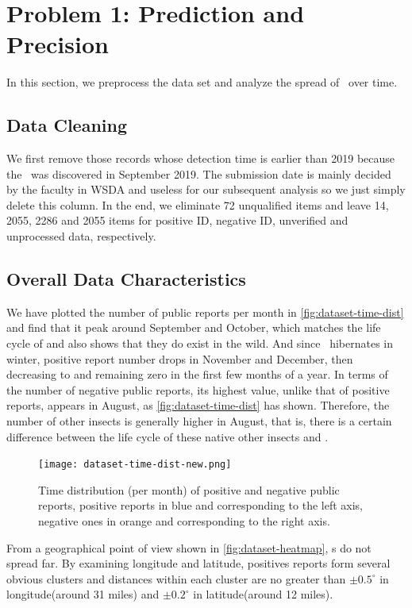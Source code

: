 \documentclass{mcmthesis}
\begin{document}
\section{Problem 1: Prediction and Precision}
In this section, we preprocess the data set and analyze the spread of \VM\ over time.
\subsection{Data Cleaning}
We first remove those records whose detection time is earlier than 2019 because the \VM\ was discovered in September 2019. The submission date is mainly decided by the faculty in WSDA and useless for our subsequent analysis so we just simply delete this column. In the end, 
we eliminate 72 unqualified items and leave 14, 2055, 2286 and 2055 items for positive ID, negative ID, unverified and unprocessed data, respectively.

\subsection{Overall Data Characteristics}
We have plotted the number of public reports per month in \autoref{fig:dataset-time-dist} and find that it
peak around September and October, which matches the life cycle of \VM \cite{matsuura1973bionomic} and also
shows that they do exist in the wild. And since \VM\ hibernates in
winter, positive report number drops in November and December, then decreasing to and remaining zero in the
first few months of a year. In terms of the number of negative public reports, its highest value, unlike
that of positive reports, appears in August, as \autoref{fig:dataset-time-dist} has shown. Therefore, the
number of other insects is generally higher in August, that is, there is a certain difference between the life cycle of these native other insects and \VM.

\begin{figure}[ht]
    \centering
    \texttt{[image: dataset-time-dist-new.png]}
    \caption{Time distribution (per month) of positive and negative public reports, positive reports
    in blue and corresponding to the left axis, negative ones in orange and corresponding to the right
    axis.}
    \label{fig:dataset-time-dist}
\end{figure}

From a geographical point of view shown in \autoref{fig:dataset-heatmap}, \VM s do not spread far. By
examining longitude and latitude, positives reports form several obvious clusters and distances within each 
cluster are no greater than $\pm 0.5^\circ$ in longitude(around 31 miles) and $\pm 0.2^\circ$ in
latitude(around 12 miles).
\end{document}
